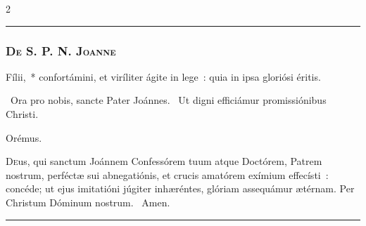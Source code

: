 \documentclass[9pt,twoside]{extarticle}
\begin{document}
\begin{multicols}{2}
\begin{center}\textcolor{red}{\rule{\linewidth}{0.5pt}} \end{center}

\subsubsection*{\center \textsc{De S. P. N. Joanne}}
\begin{tightlist}{}
\item {} Fílii,~* confortámini, et viríliter ágite in lege~: quia in ipsa gloriósi éritis.
\item {}~Ora pro nobis, sancte Pater Joánnes. ~Ut digni efficiámur promissiónibus Christi.
\item Orémus. \hfill {}
\end{tightlist}
\lettrine{D}eus, qui sanctum Joánnem Confessórem tuum atque Doctórem, Patrem nostrum, perféctæ sui abnegatiónis, et crucis amatórem exímium effecísti~: concéde; ut ejus imitatióni júgiter inhæréntes, glóriam assequámur ætérnam. Per Christum Dóminum nostrum. ~Amen.

\begin{center}\textcolor{red}{\rule{\linewidth}{0.5pt}} \end{center}
\end{multicols}
\end{document}
